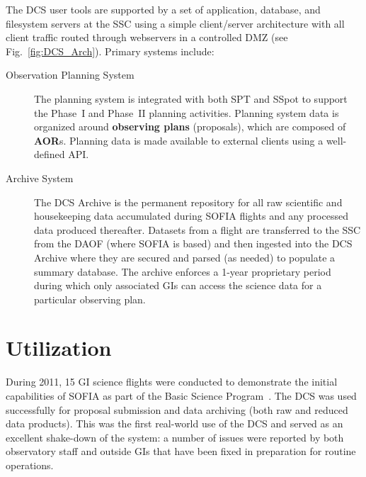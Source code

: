 The DCS user tools are supported by a set of application, database, and filesystem servers at the SSC using a simple client/server architecture with all client traffic routed through webservers in a controlled DMZ (see Fig.~\ref{fig:DCS_Arch}).  Primary systems include:


\begin{description}


\item[Observation Planning System] The planning system is integrated with both SPT and SSpot to support the Phase~I and Phase~II planning activities.  Planning system data is organized around {\bf observing plans} (proposals), which are composed of {\bf AOR}s.  Planning data is made available to external clients \citep[e.g. Flight Management Infrastructure,][]{Gross:2009} using a well-defined API.  

\item[Archive System] The DCS Archive is the permanent repository for all raw scientific and housekeeping data accumulated during SOFIA flights and any processed data produced thereafter. Datasets from a flight are transferred to the SSC from the DAOF (where SOFIA is based) and then ingested into the DCS Archive where they are secured and parsed (as needed) to populate a summary database.  The archive enforces a 1-year proprietary period during which only associated GIs can access the science data for a particular observing plan.

\end{description}



\section{Utilization}

During 2011, 15 GI science flights were conducted to demonstrate the initial capabilities of SOFIA as part of the Basic Science Program~\citep{Young:2012}.  The DCS was used successfully for proposal submission and data archiving (both raw and reduced data products).  This was the first real-world use of the DCS and served as an excellent shake-down of the system:  a number of issues were reported by both observatory staff and outside GIs that have been fixed in preparation for routine operations.


